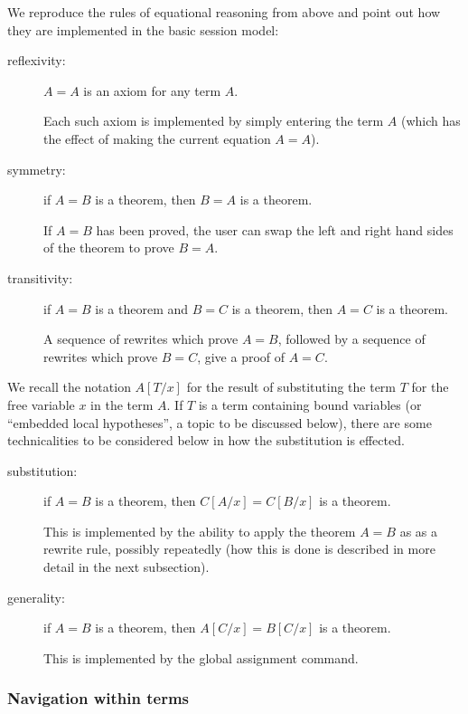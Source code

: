 \documentclass{kluwer}
\begin{document}
\begin{article}
We reproduce the rules of equational reasoning from above and point out
how they are implemented in the basic session model:

\begin{description}

\item [reflexivity:] $A = A$ is an axiom for any term $A$.

Each such axiom is implemented by simply entering the term $A$ (which
has the effect of making the current equation $A = A$).

\item [symmetry:] if $A = B$ is a theorem, then $B = A$ is a theorem.

If $A = B$ has been proved, the user can swap the left and right hand 
sides of the theorem to prove $B = A$.

\item [transitivity:] if $A = B$ is a theorem and $B = C$ is a theorem, 
then $A = C$ is a theorem.

A sequence of rewrites which prove $A = B$, followed by a sequence of
rewrites which prove $B = C$, give a proof of $A = C$.

\end{description}

We recall the notation $A[T/x]$ for the result of substituting the
term $T$ for the free variable $x$ in the term $A$.  If $T$ is a term
containing bound variables (or ``embedded local hypotheses'', a topic
to be discussed below), there are some technicalities to be considered
below in how the substitution is effected.

\begin{description}

\item [substitution:] if $A = B$ is a theorem, then $C[A/x] = C[B/x]$ 
is a theorem.

This is implemented by the ability to apply the theorem $A = B$ as as
a rewrite rule, possibly repeatedly (how this is done is described in
more detail in the next subsection).

\item [generality:]  if $A = B$ is a theorem, then $A[C/x] = B[C/x]$ 
is a theorem.

This is implemented by the global assignment command.

\end{description}

\subsubsection {Navigation within terms}


\end{article}
\end{document}
